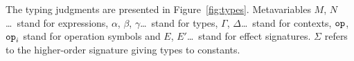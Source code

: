 The typing judgments are presented in Figure~\ref{fig:types}. Metavariables
$M$, $N$\ldots\ stand for expressions, $\alpha$, $\beta$,
$\gamma$\ldots\ stand for types, $\Gamma$, $\Delta$\ldots\ stand for
contexts, $\mathtt{op}$, $\mathtt{op}_i$ stand for operation symbols and $E$,
$E'$\ldots\ stand for effect signatures. $\Sigma$ refers to the
higher-order signature giving types to constants.

\newcommand{\handlerrule}{
 \begin{prooftree}
  \AxiomC{$E = \{\typedopg{\op{op}_i}{\alpha_i}{\beta_i}\}_{i \in I} \uplus E_f$}
  \noLine
  \def\extraVskip{0pt}
  \UnaryInfC{$E' = E'' \uplus E_f$}
  \noLine
  \UnaryInfC{$[\Gamma \vdash M_i : \alpha_i \to (\beta_i \to
    \FF_{E'}(\delta)) \to \FF_{E'}(\delta)]_{i \in I}$}
  \noLine
  \UnaryInfC{$\Gamma \vdash M_\eta : \gamma \to \FF_{E'}(\delta)$}
  \def\extraVskip{2pt}
  \RightLabel{[$\banana{}$]}
  \UnaryInfC{$\Gamma \vdash \cibanana : \FF_{E}(\gamma) \to \FF_{E'}(\delta)$}
 \end{prooftree}}

